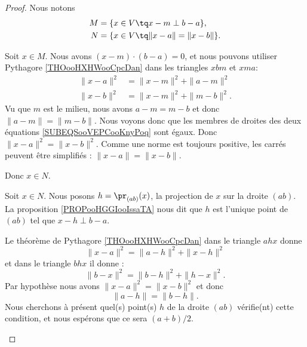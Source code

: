 \begin{proof}
	Nous notons
	\begin{subequations}
		\begin{align}
			M & =\{ x\in V\tq x-m\perp b-a \},        \\
			N & =\{ x\in V\tq \| x-a \|=\| x-b \| \}.
		\end{align}
	\end{subequations}
	\begin{subproof}
		\spitem[\( M\subset N\)]
		Soit \( x\in M\). Nous avons \( (x-m)\cdot (b-a)=0\), et nous pouvons utiliser Pythagore \ref{THOooHXHWooCpcDan} dans les triangles \( xbm\) et \( xma\):
		\begin{subequations}        \label{SUBEQSooVEPCooKnyPoq}
			\begin{align}
				\| x-a \|^2 & =\| x-m \|^2+\| a-m \|^2  \\
				\| x-b \|^2 & =\| x-m \|^2+\| m-b \|^2.
			\end{align}
		\end{subequations}
		Vu que \( m\) est le milieu, nous avons \( a-m=m-b\) et donc \( \| a-m \|=\| m-b \|\). Nous voyons donc que les membres de droites des deux équations \eqref{SUBEQSooVEPCooKnyPoq} sont égaux. Donc \( \| x-a \|^2=\| x-b \|^2\). Comme une norme est toujours positive, les carrés peuvent être simplifiés : \( \| x-a \|=\| x-b \|\).

		Donc \( x\in N\).

		\spitem[\( N\subset M\)]
		Soit \( x\in N\). Nous posons \( h=\pr_{(ab)}(x)\), la projection de \( x\) sur la droite \( (ab)\). La proposition \ref{PROPooHGGIooIssaTA} nous dit que \( h\) est l'unique point de \( (ab)\) tel que \( x-h\perp b-a\).

		Le théorème de Pythagore \ref{THOooHXHWooCpcDan} dans le triangle \( ahx\) donne
		\begin{equation}
			\| x-a \|^2=\| a-h \|^2+\| x-h \|^2
		\end{equation}
		et dans le triangle \( bhx\) il donne :
		\begin{equation}
			\| b-x \|^2=\| b-h \|^2+\| h-x \|^2.
		\end{equation}
		Par hypothèse nous avons \( \| x-a \|^2=\| x-b \|^2\) et donc
		\begin{equation}
			\| a-h \|=\| b-h \|.
		\end{equation}
		Nous cherchons à présent quel(s) point(s) \( h\) de la droite \( (ab)\) vérifie(nt) cette condition, et nous espérons que ce sera \( (a+b)/2\).


\end{subproof}
\end{proof}
